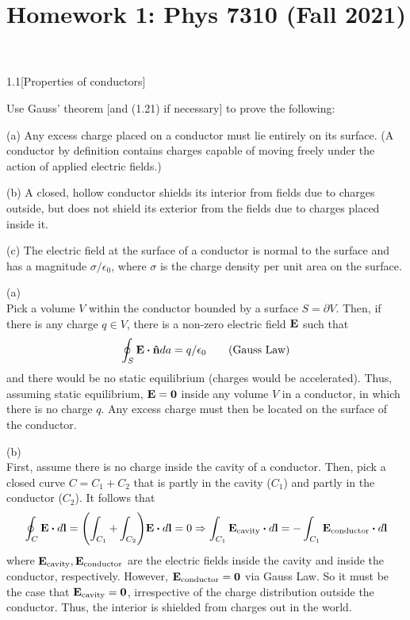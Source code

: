 \documentclass[12pt]{article}
\title{Homework 1: Phys 7310 (Fall 2021)}
\begin{document}
\maketitle

\begin{problem}{1.1}[Properties of conductors]\label{p1}

Use Gauss' theorem [and (1.21) if necessary] to prove the following:

(a) Any excess charge placed on a conductor must lie entirely on its surface. (A
conductor by definition contains charges capable of moving freely under the
action of applied electric fields.)

(b) A closed, hollow conductor shields its interior from fields due to charges
outside, but does not shield its exterior from the fields due to charges placed
inside it.

(c) The electric field at the surface of a conductor is normal to the surface
and has a magnitude $\sigma/\epsilon_0$, where $\sigma$ is the charge density
per unit area on the surface.

\begin{solution}
(a)\\[2in]
Pick a volume $V$ within the conductor bounded by a surface $S=\partial V$.
Then, if there is any charge $q\in V$, there is a non-zero electric field
$\vb{E}$ such that
\begin{equation}
    \oint_S\vb{E}\vdot\nhat da=q/\epsilon_0\tag{Gauss Law}
\end{equation}
and there would be no static equilibrium (charges would be accelerated). Thus,
assuming static equilibrium, $\vb{E}=\vb{0}$ inside any volume $V$ in a 
conductor, in which there is no charge $q$. Any excess charge must then be
located on the surface of the conductor.
\newpage

(b)\\[2in]
First, assume there is no charge inside the cavity of a conductor. Then,
pick a closed curve $C=C_1+C_2$ that is partly in the cavity ($C_1$) and partly 
in the conductor ($C_2$). It follows that
\begin{equation}
    \oint_C\vb{E}\vdot d\vb{l}=\qty(\int_{C_1}+\int_{C_2})\vb{E}\vdot d\vb{l}=0 
    \Rightarrow\int_{C_1}\vb{E}_{\text{cavity}}\vdot d\vb{l}
    =-\int_{C_1}\vb{E}_{\text{conductor}}\vdot d\vb{l}
\end{equation}
where $\vb{E}_{\text{cavity}},\vb{E}_{\text{conductor}}$ are the
electric fields inside the cavity and inside the conductor, respectively.
However, $\vb{E}_{\text{conductor}}=\vb{0}$ via Gauss Law. So it must be the
case that $\vb{E}_{\text{cavity}}=\vb{0}$, irrespective of the charge
distribution outside the conductor. Thus, the interior is shielded from charges
out in the world.\\[2in]


\end{solution}
\end{problem}
\end{document}
